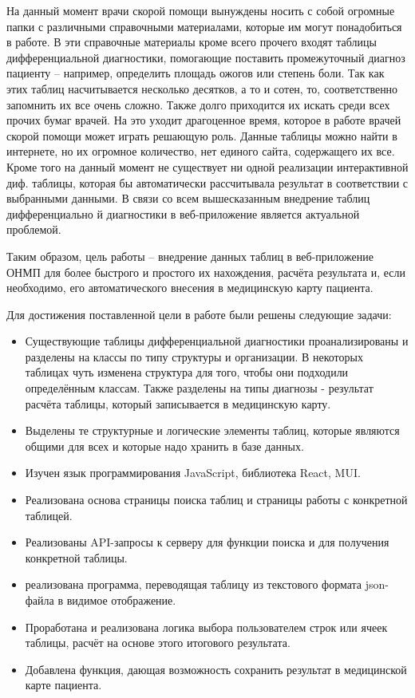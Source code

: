 \introduction %

На данный момент врачи скорой помощи вынуждены носить  с собой огромные папки с различными справочными материалами, которые им могут понадобиться в работе. В эти справочные материалы кроме всего прочего входят таблицы дифференциальной диагностики, помогающие поставить промежуточный диагноз пациенту – например, определить площадь ожогов или степень боли. Так как этих таблиц насчитывается несколько десятков, а то и сотен, то, соответственно запомнить их все очень сложно. Также долго приходится их искать среди всех прочих бумаг врачей. На это уходит драгоценное время, которое в работе врачей скорой помощи может играть решающую роль. Данные таблицы можно найти в интернете, но их огромное количество, нет единого сайта, содержащего их все. Кроме того на данный момент не существует ни одной реализации интерактивной диф. таблицы, которая бы автоматически рассчитывала результат в соответствии с выбранными данными. В связи со всем вышесказанным внедрение таблиц дифференциально й диагностики в веб-приложение является актуальной проблемой.

Таким образом, цель работы – внедрение данных таблиц в веб-приложение ОНМП для более быстрого и простого их нахождения, расчёта результата и, если необходимо, его автоматического внесения в медицинскую карту пациента.

Для достижения поставленной цели в работе были решены следующие задачи:

\begin{itemize}
\item Существующие таблицы дифференциальной диагностики проанализированы и разделены на классы по типу структуры и организации. В некоторых таблицах чуть изменена структура для того, чтобы они подходили определённым классам. Также разделены на типы диагнозы - результат расчёта таблицы, который записывается в медицинскую карту.
\item Выделены те структурные и логические элементы таблиц, которые являются общими для всех и которые надо хранить в базе данных.
\item Изучен язык программирования JavaScript, библиотека React, MUI.
\item Реализована основа страницы поиска таблиц и страницы работы с конкретной таблицей.
\item Реализованы API-запросы к серверу для функции поиска и для получения конкретной таблицы.
\item реализована программа, переводящая таблицу из текстового формата json-файла в видимое отображение.
\item Проработана и реализована логика выбора пользователем строк или ячеек таблицы, расчёт на основе этого итогового результата.
\item Добавлена функция, дающая возможность сохранить результат в медицинской карте пациента.
\end{itemize}

